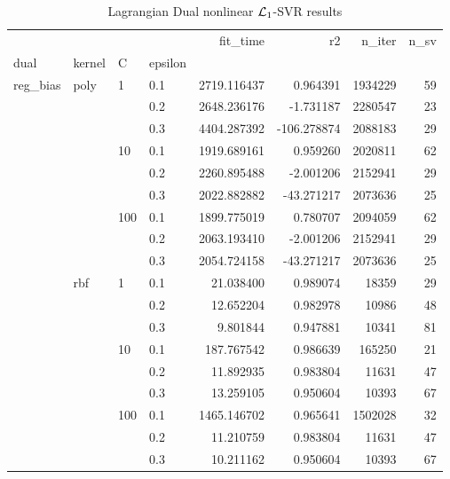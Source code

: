 \begin{table}[H]
\centering
\caption{Lagrangian Dual nonlinear $\protect \mathcal{L}_1$-SVR results}
\label{nonlinear_lagrangian_dual_l1_svr_cv_results}
\begin{tabular}{llllrrrr}
\toprule
           &     &     &     &     fit\_time &          r2 &   n\_iter &  n\_sv \\
dual & kernel & C & epsilon &              &             &          &       \\
\midrule
reg\_bias & poly & 1   & 0.1 &  2719.116437 &    0.964391 &  1934229 &    59 \\
           &     &     & 0.2 &  2648.236176 &   -1.731187 &  2280547 &    23 \\
           &     &     & 0.3 &  4404.287392 & -106.278874 &  2088183 &    29 \\
           &     & 10  & 0.1 &  1919.689161 &    0.959260 &  2020811 &    62 \\
           &     &     & 0.2 &  2260.895488 &   -2.001206 &  2152941 &    29 \\
           &     &     & 0.3 &  2022.882882 &  -43.271217 &  2073636 &    25 \\
           &     & 100 & 0.1 &  1899.775019 &    0.780707 &  2094059 &    62 \\
           &     &     & 0.2 &  2063.193410 &   -2.001206 &  2152941 &    29 \\
           &     &     & 0.3 &  2054.724158 &  -43.271217 &  2073636 &    25 \\
           & rbf & 1   & 0.1 &    21.038400 &    0.989074 &    18359 &    29 \\
           &     &     & 0.2 &    12.652204 &    0.982978 &    10986 &    48 \\
           &     &     & 0.3 &     9.801844 &    0.947881 &    10341 &    81 \\
           &     & 10  & 0.1 &   187.767542 &    0.986639 &   165250 &    21 \\
           &     &     & 0.2 &    11.892935 &    0.983804 &    11631 &    47 \\
           &     &     & 0.3 &    13.259105 &    0.950604 &    10393 &    67 \\
           &     & 100 & 0.1 &  1465.146702 &    0.965641 &  1502028 &    32 \\
           &     &     & 0.2 &    11.210759 &    0.983804 &    11631 &    47 \\
           &     &     & 0.3 &    10.211162 &    0.950604 &    10393 &    67 \\

\end{tabular}
\end{table}
